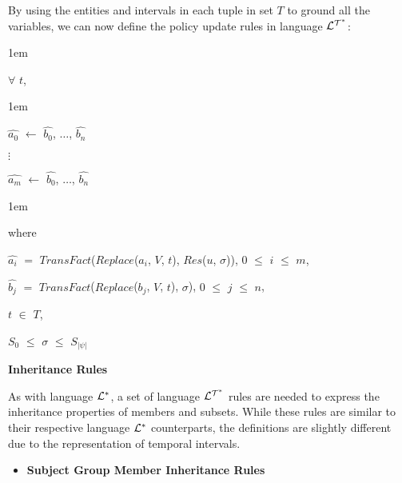 \documentclass[11pt]{report}
\newenvironment{vquote}
{
  \begin{list}{}{\leftmargin 1em}\item[]
}
{
  \end{list}
}
\begin{document}
\begin{itemize}
              \noindent
              By using the entities and intervals in each tuple in set $T$
              to ground all the variables, we can now define the policy
              update rules in language ${\cal L^{T^*}}$:
              
              \begin{vquote}
                $\forall$ $t$,
              \end{vquote}

              \begin{vquote}
                $\hat{a_0}$ $\leftarrow$ $\hat{b_0}$, $\ldots$, $\hat{b_n}$

                $\vdots$

                $\hat{a_m}$ $\leftarrow$ $\hat{b_0}$, $\ldots$, $\hat{b_n}$
              \end{vquote}

              \begin{vquote}
                where

                \hspace{1em}
                $\hat{a_i}$ $=$ $TransFact$($Replace$($a_i$, $V$, $t$), $Res$($u$, $\sigma$)), $0$ $\leq$ $i$ $\leq$ $m$,

                \hspace{1em}
                $\hat{b_j}$ $=$ $TransFact$($Replace$($b_j$, $V$, $t$), $\sigma$), $0$ $\leq$ $j$ $\leq$ $n$,

                \hspace{1em}
                $t$ $\in$ $T$,

                \hspace{1em}
                $S_0$ $\leq$ $\sigma$ $\leq$ $S_{|\psi|}$
              \end{vquote}

            \item
              {\bf Inheritance Rules}

                As with language ${\cal L^*}$, a set of language
                ${\cal L^{T^*}}$ rules are needed to express the inheritance
                properties of members and subsets. While these rules are
                similar to their respective language ${\cal L^*}$ counterparts,
                the definitions are slightly different due to the
                representation of temporal intervals.

                \begin{itemize}
                  \item
                    {\bf Subject Group Member Inheritance Rules}


\end{itemize}
\end{itemize}
\end{document}
